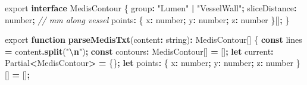 \documentclass[
  11pt,
]{article}
\newenvironment{Shaded}{\begin{snugshade}}{\end{snugshade}}
\newcommand{\BuiltInTok}[1]{#1}
\newcommand{\CommentTok}[1]{\textcolor[rgb]{0.56,0.35,0.01}{\textit{#1}}}
\newcommand{\DataTypeTok}[1]{\textcolor[rgb]{0.13,0.29,0.53}{#1}}
\newcommand{\FunctionTok}[1]{\textcolor[rgb]{0.13,0.29,0.53}{\textbf{#1}}}
\newcommand{\ImportTok}[1]{#1}
\newcommand{\KeywordTok}[1]{\textcolor[rgb]{0.13,0.29,0.53}{\textbf{#1}}}
\newcommand{\NormalTok}[1]{#1}
\newcommand{\OperatorTok}[1]{\textcolor[rgb]{0.81,0.36,0.00}{\textbf{#1}}}
\newcommand{\SpecialCharTok}[1]{\textcolor[rgb]{0.81,0.36,0.00}{\textbf{#1}}}
\newcommand{\StringTok}[1]{\textcolor[rgb]{0.31,0.60,0.02}{#1}}
\begin{document}
\begin{Shaded}
\begin{Highlighting}[]
\ImportTok{export} \KeywordTok{interface}\NormalTok{ MedisContour \{}
\NormalTok{  group}\OperatorTok{:} \StringTok{"Lumen"} \OperatorTok{|} \StringTok{"VesselWall"}\OperatorTok{;}
\NormalTok{  sliceDistance}\OperatorTok{:} \DataTypeTok{number}\OperatorTok{;}           \CommentTok{// mm along vessel}
\NormalTok{  points}\OperatorTok{:}\NormalTok{ \{ x}\OperatorTok{:} \DataTypeTok{number}\OperatorTok{;}\NormalTok{ y}\OperatorTok{:} \DataTypeTok{number}\OperatorTok{;}\NormalTok{ z}\OperatorTok{:} \DataTypeTok{number}\NormalTok{ \}[]}\OperatorTok{;}
\NormalTok{\}}

\ImportTok{export} \KeywordTok{function} \FunctionTok{parseMedisTxt}\NormalTok{(content}\OperatorTok{:} \DataTypeTok{string}\NormalTok{)}\OperatorTok{:}\NormalTok{ MedisContour[] \{}
  \KeywordTok{const}\NormalTok{ lines }\OperatorTok{=}\NormalTok{ content}\OperatorTok{.}\FunctionTok{split}\NormalTok{(}\StringTok{"}\SpecialCharTok{\textbackslash{}n}\StringTok{"}\NormalTok{)}\OperatorTok{;}
  \KeywordTok{const}\NormalTok{ contours}\OperatorTok{:}\NormalTok{ MedisContour[] }\OperatorTok{=}\NormalTok{ []}\OperatorTok{;}
  \KeywordTok{let}\NormalTok{ current}\OperatorTok{:} \BuiltInTok{Partial}\OperatorTok{\textless{}}\NormalTok{MedisContour}\OperatorTok{\textgreater{}} \OperatorTok{=}\NormalTok{ \{\}}\OperatorTok{;}
  \KeywordTok{let}\NormalTok{ points}\OperatorTok{:}\NormalTok{ \{ x}\OperatorTok{:} \DataTypeTok{number}\OperatorTok{;}\NormalTok{ y}\OperatorTok{:} \DataTypeTok{number}\OperatorTok{;}\NormalTok{ z}\OperatorTok{:} \DataTypeTok{number}\NormalTok{ \}[] }\OperatorTok{=}\NormalTok{ []}\OperatorTok{;}


\end{Highlighting}
\end{Shaded}
\end{document}
